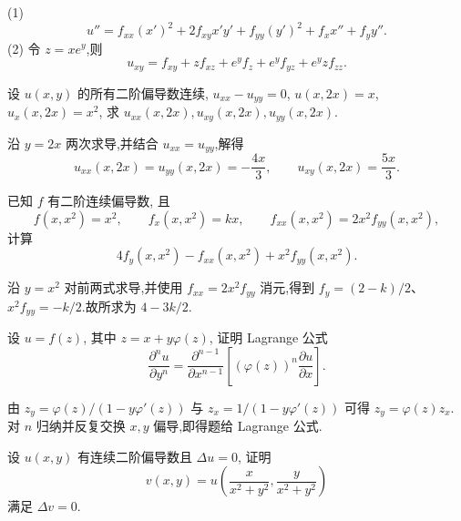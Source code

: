 \begin{solution}
    (1)
    \[
        u''=f_{xx}(x')^2+2f_{xy}x'y'+f_{yy}(y')^2+f_xx''+f_yy''.
    \]
    (2) 令 $z=xe^y$,则
    \[
        u_{xy}=f_{xy}+zf_{xz}+e^yf_z+e^yf_{yz}+e^yzf_{zz}.
    \]
\end{solution}

\begin{example}
    设 $u(x,y)$ 的所有二阶偏导数连续, $u_{xx}-u_{yy}=0$, $u(x,2x)=x$, $u_x(x,2x)=x^2$, 求 $u_{xx}(x,2x),u_{xy}(x,2x),u_{yy}(x,2x)$.
\end{example}
\exampleblank

\begin{solution}
    沿 $y=2x$ 两次求导,并结合 $u_{xx}=u_{yy}$,解得
    \[
        u_{xx}(x,2x)=u_{yy}(x,2x)=-\dfrac{4x}{3},\qquad
        u_{xy}(x,2x)=\dfrac{5x}{3}.
    \]
\end{solution}

\begin{example}
    已知 $f$ 有二阶连续偏导数, 且
    \[
        f(x,x^2)=x^2,\qquad f_x(x,x^2)=kx,\qquad f_{xx}(x,x^2)=2x^2f_{yy}(x,x^2),
    \]
    计算
    \[
        4f_y(x,x^2)-f_{xx}(x,x^2)+x^2f_{yy}(x,x^2).
    \]
\end{example}
\exampleblank

\begin{solution}
    沿 $y=x^2$ 对前两式求导,并使用 $f_{xx}=2x^2f_{yy}$ 消元,得到 $f_y=(2-k)/2$、$x^2f_{yy}=-k/2$.故所求为 $4-3k/2$.
\end{solution}

\begin{example}
    设 $u=f(z)$, 其中 $z=x+y\varphi(z)$, 证明 Lagrange 公式
    \[
        \dfrac{\partial^nu}{\partial y^n}
        =\dfrac{\partial^{n-1}}{\partial x^{n-1}}
        \left[(\varphi(z))^n\dfrac{\partial u}{\partial x}\right].
    \]
\end{example}
\exampleblank

\begin{solution}
    由 $z_y=\varphi(z)/(1-y\varphi'(z))$ 与 $z_x=1/(1-y\varphi'(z))$ 可得 $z_y=\varphi(z)z_x$.对 $n$ 归纳并反复交换 $x,y$ 偏导,即得题给 Lagrange 公式.
\end{solution}

\begin{example}
    设 $u(x,y)$ 有连续二阶偏导数且 $\Delta u=0$, 证明
    \[
        v(x,y)=u\left(\dfrac{x}{x^2+y^2},\dfrac{y}{x^2+y^2}\right)
    \]
    满足 $\Delta v=0$.
\end{example}
\exampleblank

